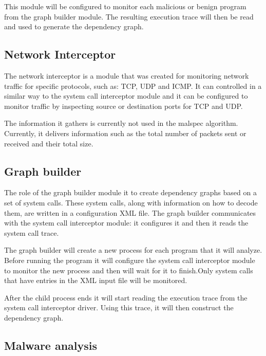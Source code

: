 This module will be configured to monitor each malicious or benign program from the graph builder module. The resulting execution trace will then be read and used to generate the dependency graph.

\subsection{Network Interceptor}

The network interceptor is a module that was created for monitoring network traffic for specific protocols, such as: TCP, UDP and ICMP. It can controlled in a similar way to the system call interceptor module and it can be configured to monitor traffic by inspecting source or destination ports for TCP and UDP.

The information it gathers is currently not used in the malspec algorithm. Currently, it delivers information such as the total number of packets sent or received and their total size.

  

\subsection{Graph builder}

The role of the graph builder module it to create dependency graphs based on a set of system calls. These system calls, along with information on how to decode them, are written in a configuration XML file. The graph builder communicates with the system call interceptor module: it configures it and then it reads the system call trace.

The graph builder will create a new process for each program that it will analyze. Before running the program it will configure the system call interceptor module to monitor the new process and then will wait for it to finish.Only system calls that have entries in the XML input file will be monitored.

After the child process ends it will start reading the execution trace from the system call interceptor driver. Using this trace, it will then construct the dependency graph.

\subsection{Malware analysis}
 
